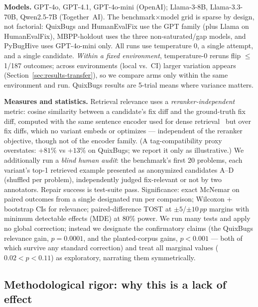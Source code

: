 \documentclass[10pt,conference]{IEEEtran}
\newcommand{\pp}{\,pp}
\begin{document}
\textbf{Models.} GPT-4o, GPT-4.1, GPT-4o-mini (OpenAI); Llama-3-8B,
Llama-3.3-70B, Qwen2.5-7B (Together~AI). The benchmark$\times$model grid is
sparse by design, not factorial: QuixBugs and HumanEvalFix use the GPT
family (plus Llama on HumanEvalFix), MBPP-holdout uses the three
non-saturated/gap models, and PyBugHive uses GPT-4o-mini only. All runs use
temperature 0, a single attempt, and a single candidate. \emph{Within a
fixed environment}, temperature-0 reruns flip $\le$1/187 outcomes; across
environments (local vs.\ CI) larger variation appears
(Section~\ref{sec:results-transfer}), so we compare arms only within the
same environment and run. QuixBugs results are 5-trial means where variance
matters.

\textbf{Measures and statistics.} Retrieval relevance uses a
\emph{reranker-independent} metric: cosine similarity between a candidate's
fix diff and the ground-truth fix diff, computed with the same sentence
encoder used for dense retrieval~\cite{sbert} but over fix diffs, which no
variant embeds or optimizes --- independent of the reranker objective,
though not of the encoder family. (A tag-compatibility proxy overstates:
$+81\%$ vs $+13\%$ on QuixBugs; we report it only as illustrative.) We
additionally run a \emph{blind human audit}: the benchmark's first 20
problems, each variant's top-1 retrieved example presented as anonymized
candidates A--D (shuffled per problem), independently judged fix-relevant
or not by two annotators. Repair success is test-suite pass. Significance:
exact McNemar on paired outcomes from a single designated run per
comparison; Wilcoxon + bootstrap CIs for relevance; paired-difference TOST
at $\pm 5$/$\pm 10\pp$ margins with minimum detectable effects (MDE) at
80\% power. We run many tests and apply no global correction; instead we
designate the confirmatory claims (the QuixBugs relevance gain,
$p{=}0.0001$, and the planted-corpus gains, $p{<}0.001$ --- both of which
survive any standard correction) and treat all marginal values
($0.02{<}p{<}0.11$) as exploratory, narrating them symmetrically.

\subsection{Methodological rigor: why this is a lack of effect}
\label{sec:rigor}
\end{document}
